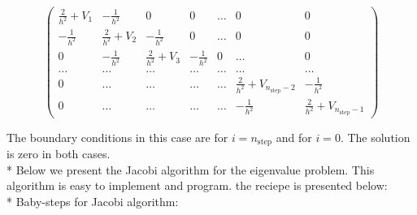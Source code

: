 \documentclass[10pt]{article}
\begin{document}
\[
\left( 
\begin{array}{ccccccc}
\frac{2}{h^{2}}+V_{1} & -\frac{1}{h^{2}} & 0 & 0 & \dots  & 0 & 0 \\ 
-\frac{1}{h^{2}} & \frac{2}{h^{2}}+V_{2} & -\frac{1}{h^{2}} & 0 & \dots  & 0
& 0 \\ 
0 & -\frac{1}{h^{2}} & \frac{2}{h^{2}}+V_{3} & -\frac{1}{h^{2}} & 0 & \dots 
& 0 \\ 
\dots  & \dots  & \dots  & \dots  & \dots  & \dots  & \dots  \\ 
0 & \dots  & \dots  & \dots  & \dots  & \frac{2}{h^{2}}+V_{n_{\mathrm{step}%
	}-2} & -\frac{1}{h^{2}} \\ 
0 & \dots  & \dots  & \dots  & \dots  & -\frac{1}{h^{2}} & \frac{2}{h^{2}}%
+V_{n_{\mathrm{step}}-1}%
\end{array}%
\right) 
\]

The boundary conditions in this case are for $i=n_{\mathrm{step}}$ and for $%
i=0$. The solution is zero in both cases.\\*
Below we present the Jacobi algorithm for the eigenvalue problem. This algorithm is easy to implement and program. the reciepe is presented below:
\\*
Baby-steps for Jacobi algorithm:
\end{document}
